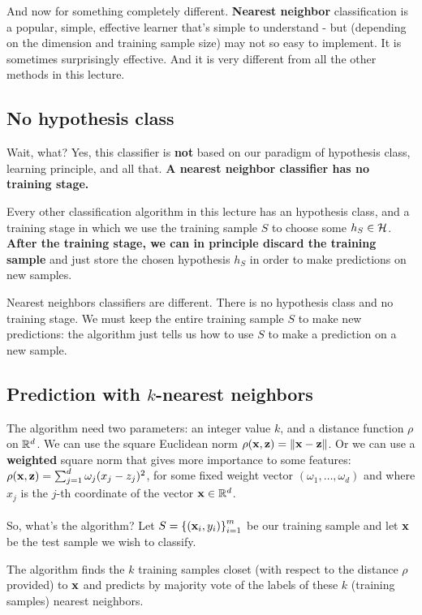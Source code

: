 And now for something completely different. {\bf Nearest neighbor}
classification is a popular, simple, effective learner that's simple to
understand - but (depending on the dimension and training sample size) may not so easy to implement. 
It is sometimes surprisingly
effective. And it is very different from all the other methods in this lecture.

\subsection{No hypothesis class}

Wait, what? 
Yes, this classifier is {\bf not} based
on our paradigm of hypothesis class, learning principle, and all that. {\bf A nearest
neighbor classifier has no training stage.} 

Every other classification algorithm in this lecture has an hypothesis class,
and a training stage in which we use the training sample $S$ to choose
some $h_S\in\mathcal{H}$. {\bf After the training stage, we can in principle discard  the
training sample} and just store the chosen hypothesis $h_S$ in order to make
predictions on new samples. 

Nearest neighbors classifiers are different. There is no hypothesis class and no
training stage. We must keep the entire training sample $S$ to make new
predictions: the algorithm just tells us how to use $S$ to make a prediction on
a new sample. 

\subsection{Prediction with $k$-nearest neighbors}

The algorithm need two parameters: an integer value $k$, and a distance function
$\rho$ on $\mathbb{R}^d$. We can use the square Euclidean norm $\rho(\mathbf{x},\mathbf{z}) = 
\left\| \mathbf{x}-\mathbf{z}\right\|$. Or we can use a {\bf weighted} square norm that gives more
importance to some features: $\rho(\mathbf{x},\mathbf{z}) = \sum_{j=1}^d \omega_j
(x_j-z_j)^2$, for some fixed weight vector $(\omega_1,\ldots,\omega_d)$ and
where $x_j$ is the $j$-th coordinate of the vector $\mathbf{x}\in\mathbb{R}^d$. 
 \\~\\
So, what's the algorithm? Let $S=\left\{ (\mathbf{x}_i,y_i) \right\}_{i=1}^m$ be our
training sample and let $\mathbf{x}$ be the test sample we wish to classify. 

The algorithm finds the $k$ training samples closet (with respect to the
distance $\rho$ provided) to $\mathbf{x}$ and predicts by majority vote of the labels
of  these $k$ (training samples) 
nearest neighbors.

